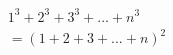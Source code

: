 \documentclass[preview]{standalone}
\begin{document}
\begin{align*}
1^3 + 2^3 + 3^3 + ... + n^3\\= (1 + 2 + 3 + ... + n)^2
\end{align*}
\end{document}
